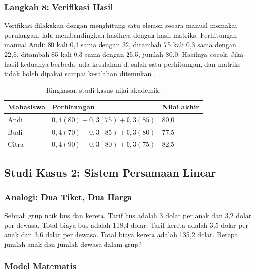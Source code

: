 \documentclass[11pt,a4paper]{article}
\begin{document}
\subsubsection{Langkah 8: Verifikasi Hasil}

Verifikasi dilakukan dengan menghitung satu elemen secara manual memakai perulangan, lalu membandingkan hasilnya dengan hasil matriks. Perhitungan manual Andi: 80 kali 0,4 sama dengan 32, ditambah 75 kali 0,3 sama dengan 22,5, ditambah 85 kali 0,3 sama dengan 25,5, jumlah 80,0. Hasilnya cocok. Jika hasil keduanya berbeda, ada kesalahan di salah satu perhitungan, dan matriks tidak boleh dipakai sampai kesalahan ditemukan \cite{silberschatz}.

\begin{table}[H]
	\centering
	\caption{Ringkasan studi kasus nilai akademik.}
	\label{tab:studi-nilai}
	\small
	\begin{tabularx}{\textwidth}{l X X}
		\toprule
		Mahasiswa & Perhitungan                     & Nilai akhir \\
		\midrule
		Andi      & $0{,}4(80)+0{,}3(75)+0{,}3(85)$ & 80,0        \\
		Budi      & $0{,}4(70)+0{,}3(85)+0{,}3(80)$ & 77,5        \\
		Citra     & $0{,}4(90)+0{,}3(80)+0{,}3(75)$ & 82,5        \\
		\bottomrule
	\end{tabularx}
\end{table}

\subsection{Studi Kasus 2: Sistem Persamaan Linear}

\subsubsection{Analogi: Dua Tiket, Dua Harga}

Sebuah grup naik bus dan kereta. Tarif bus adalah 3 dolar per anak dan 3,2 dolar per dewasa. Total biaya bus adalah 118,4 dolar. Tarif kereta adalah 3,5 dolar per anak dan 3,6 dolar per dewasa. Total biaya kereta adalah 135,2 dolar. Berapa jumlah anak dan jumlah dewasa dalam grup?

\subsubsection{Model Matematis}
\end{document}
